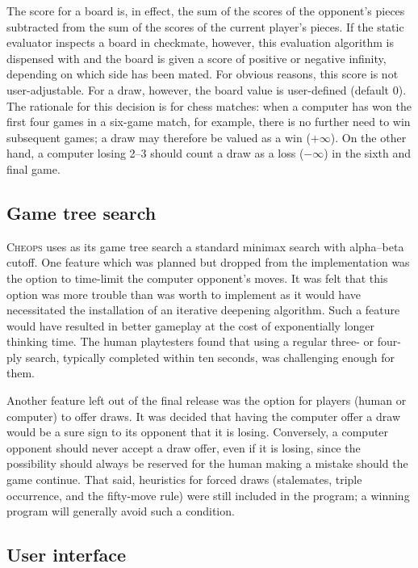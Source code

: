 \documentclass[12pt]{article}
\begin{document}
The score for a board is, in effect, the sum of the scores of the
opponent's pieces subtracted from the sum of the scores of the current
player's pieces. If the static evaluator inspects a board in
checkmate, however, this evaluation algorithm is dispensed with and
the board is given a score of positive or negative infinity, depending
on which side has been mated. For obvious reasons, this score is not
user-adjustable. For a draw, however, the board value is user-defined
(default 0). The rationale for this decision is for chess matches:
when a computer has won the first four games in a six-game match, for
example, there is no further need to win subsequent games; a draw may
therefore be valued as a win ($+\infty$). On the other hand, a
computer losing 2--3 should count a draw as a loss ($-\infty$) in the
sixth and final game.


\subsection{Game tree search}

\textsc{Cheops} uses as its game tree search a standard minimax search
with alpha--beta cutoff. One feature which was planned but dropped
from the implementation was the option to time-limit the computer
opponent's moves. It was felt that this option was more trouble than
was worth to implement as it would have necessitated the installation
of an iterative deepening algorithm. Such a feature would have
resulted in better gameplay at the cost of exponentially longer
thinking time. The human playtesters found that using a regular three-
or four-ply search, typically completed within ten seconds, was
challenging enough for them.

Another feature left out of the final release was the option for
players (human or computer) to offer draws. It was decided that having
the computer offer a draw would be a sure sign to its opponent that it
is losing. Conversely, a computer opponent should never accept a draw
offer, even if it is losing, since the possibility should always be
reserved for the human making a mistake should the game continue. That
said, heuristics for forced draws (stalemates, triple occurrence, and
the fifty-move rule) were still included in the program; a winning
program will generally avoid such a condition.

\subsection{User interface}
\end{document}
